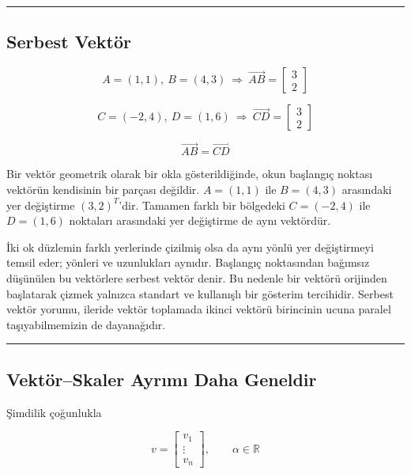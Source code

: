 \documentclass[
  a4paper,
  DIV=11,
  numbers=noendperiod]{scrartcl}
\begin{document}
\begin{center}\rule{0.5\linewidth}{0.5pt}\end{center}

\subsection{Serbest Vektör}\label{serbest-vektuxf6r}

\[
A=(1,1),\ B=(4,3)
\ \Rightarrow\
\overrightarrow{AB}=\begin{bmatrix}3\\2\end{bmatrix}
\]

\[
C=(-2,4),\ D=(1,6)
\ \Rightarrow\
\overrightarrow{CD}=\begin{bmatrix}3\\2\end{bmatrix}
\]

\[
\boxed{\overrightarrow{AB}=\overrightarrow{CD}}
\]

Bir vektör geometrik olarak bir okla gösterildiğinde, okun başlangıç
noktası vektörün kendisinin bir parçası değildir. \(A=(1,1)\) ile
\(B=(4,3)\) arasındaki yer değiştirme \((3,2)^T\)'dir. Tamamen farklı
bir bölgedeki \(C=(-2,4)\) ile \(D=(1,6)\) noktaları arasındaki yer
değiştirme de aynı vektördür.

İki ok düzlemin farklı yerlerinde çizilmiş olsa da aynı yönlü yer
değiştirmeyi temsil eder; yönleri ve uzunlukları aynıdır. Başlangıç
noktasından bağımsız düşünülen bu vektörlere serbest vektör denir. Bu
nedenle bir vektörü orijinden başlatarak çizmek yalnızca standart ve
kullanışlı bir gösterim tercihidir. Serbest vektör yorumu, ileride
vektör toplamada ikinci vektörü birincinin ucuna paralel
taşıyabilmemizin de dayanağıdır.

\begin{center}\rule{0.5\linewidth}{0.5pt}\end{center}

\subsection{Vektör--Skaler Ayrımı Daha
Geneldir}\label{vektuxf6rskaler-ayrux131mux131-daha-geneldir}

Şimdilik çoğunlukla

\[
v=
\begin{bmatrix}
v_1\\
\vdots\\
v_n
\end{bmatrix},
\qquad
\alpha\in\mathbb{R}
\]
\end{document}
